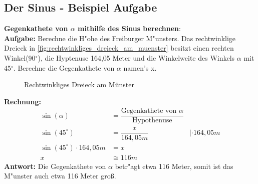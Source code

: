 \documentclass{standalone}
\begin{document}
\subsection{Der Sinus - Beispiel Aufgabe}
\textbf{Gegenkathete von $\alpha$ mithilfe des Sinus berechnen}: \\
\textbf{Aufgabe:} Berechne die H{"o}he des Freiburger M{"u}nsters. Das rechtwinklige Dreieck in \autoref{fig:rechtwinkliges_dreieck_am_muenster} besitzt einen rechten Winkel(90$^\circ$), die Hyptenuse 164,05 Meter und die Winkelweite des Winkels $\alpha$ mit 45$^\circ$. Berechne die Gegenkathete von $\alpha$ namen's x.\\
\begin{figure}[hb!]
  \centeringf
  \def\svgwidth{300px}
  
  \caption{Rechtwinkliges Dreieck am Münster}
  \label{fig:rechtwinkliges_dreieck_am_muenster}
\end{figure}

\noindent\textbf{Rechnung:}
\begin{align}
  \sin(\alpha)                  & = \dfrac{\text{Gegenkathete von $\alpha$}}{\text{Hypothenuse}} \tag{1}                  \\
  \sin(45^\circ )               & = \dfrac{x}{164,05m}                                                   & |\cdot 164,05m \\
  \sin(45^\circ ) \cdot 164,05m & = x                                                                                     \\
  x                             & \cong 116m
\end{align}
\textbf{Antwort:} Die Gegenkathete von $\alpha$ betr{"a}gt etwa 116 Meter, somit ist das M{"u}nster auch etwa 116 Meter gro{\ss}.
\end{document}

